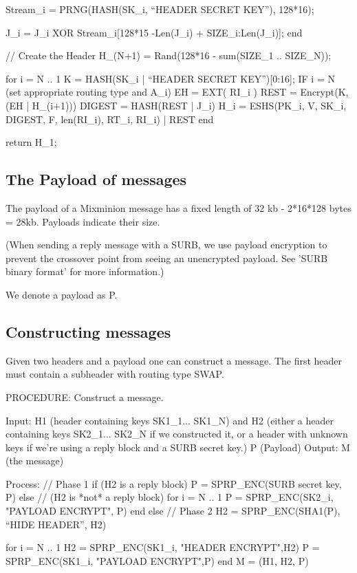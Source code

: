         Stream_i = PRNG(HASH(SK_i, ``HEADER SECRET KEY''), 128*16);

	J_i = J_i XOR Stream_i[128*15 -Len(J_i) + SIZE_i:Len(J_i)];
  end

  // Create the Header
  H_(N+1) = Rand(128*16 - sum(SIZE_1 .. SIZE_N));

  for i = N .. 1
	K = HASH(SK_i | ``HEADER SECRET KEY'')[0:16];
	IF i = N (set appropriate routing type and A_i)
	EH = EXT( RI_i )
        REST = Encrypt(K, (EH | H_(i+1)))
  	DIGEST = HASH(REST | J_i)
	H_i = ESHS(PK_i, V, SK_i, DIGEST, F, len(RI_i), RT_i, RI_i) | REST
  end

return H_1;

\subsection{The Payload of messages}

The payload of a Mixminion message has a fixed length of 32 kb
- 2*16*128 bytes = 28kb.   Payloads indicate their size.

(When sending a reply message with a SURB, we use payload encryption
to prevent the crossover point from seeing an unencrypted payload. See
'SURB binary format' for more information.)

We denote a payload as P.

\subsection{Constructing messages}

Given two headers and a payload one can construct a
message. The first header must contain a subheader
with routing type SWAP.  

PROCEDURE: Construct a message.

Input: H1 (header containing keys SK1_1... SK1_N)
       and H2 (either a header containing keys SK2_1... SK2_N if
         we constructed it, or a header with unknown keys if we're
         using a reply block and a SURB secret key.)
       P (Payload)
Output: M (the message)

Process:
        // Phase 1
        if (H2 is a reply block)
                P = SPRP_ENC(SURB secret key, P)
	else // (H2 is *not* a reply block)
		for i = N .. 1
	            P = SPRP_ENC(SK2_i, "PAYLOAD ENCRYPT", P)
		end
        else
	// Phase 2
	H2 = SPRP_ENC(SHA1(P), ``HIDE HEADER'', H2)

	for i = N .. 1
		H2 = SPRP_ENC(SK1_i, "HEADER ENCRYPT",H2)
		P = SPRP_ENC(SK1_i, "PAYLOAD ENCRYPT",P)
	end
	M = (H1, H2, P)

